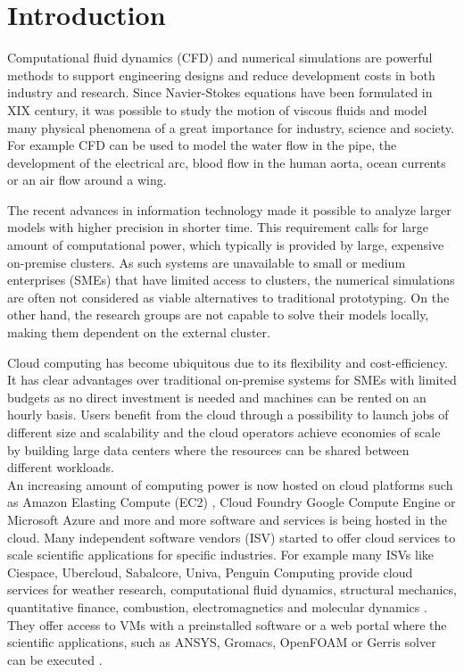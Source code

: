 \documentclass[3p,times]{elsarticle}
\begin{document}

\section{Introduction} 
\label{sec:introduction}

Computational fluid dynamics (CFD) and numerical simulations are powerful methods to support engineering designs and reduce development costs in both industry and research. Since Navier-Stokes equations have been formulated in XIX century, it was possible to study the motion of viscous fluids and  model many physical phenomena of a great importance for industry, science and society. For example CFD can be used to model the water flow in the pipe, the development of the electrical arc, blood flow in the human aorta, ocean currents or an air flow around a wing. 

The recent advances in information technology made it possible to analyze larger models with higher precision in shorter time. This requirement calls for large amount of computational power, which typically is provided by large, expensive on-premise clusters. As such systems are unavailable to small or medium enterprises (SMEs) that have limited access to clusters, the numerical simulations are often not considered as viable alternatives to traditional prototyping. On the other hand, the research groups are not capable to solve their models locally, making them dependent on the external cluster.


Cloud computing has become ubiquitous due to its flexibility and cost-efficiency. It has clear advantages over traditional on-premise systems for SMEs with limited budgets as no direct investment is needed and machines can be rented on an hourly basis. Users benefit from the cloud through a possibility to launch jobs of different size and scalability and the cloud operators achieve economies of scale by building large data centers where the resources can be shared between different workloads. \\
An increasing amount of computing power is now hosted on cloud platforms such as Amazon Elasting Compute (EC2) \cite{ec2}, Cloud Foundry Google Compute Engine \cite{google} or Microsoft Azure \cite{azure} and more and more software and services is being hosted in the cloud. Many independent software vendors (ISV) started to offer cloud services to scale scientific applications for specific industries. For example many ISVs like Ciespace, Ubercloud, Sabalcore, Univa, Penguin Computing provide cloud services for weather research, computational fluid dynamics, structural mechanics, quantitative finance, combustion, electromagnetics and molecular dynamics \cite{theuebercloud}. They offer access to VMs with a preinstalled software or a web portal where the scientific applications, such as ANSYS, Gromacs, OpenFOAM or Gerris solver can be executed \cite{Popinet2003}.
\end{document}

